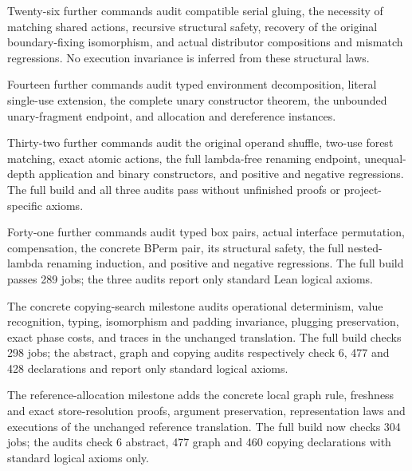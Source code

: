 Twenty-six further commands audit compatible serial gluing, the necessity of
matching shared actions, recursive structural safety, recovery of the original
boundary-fixing isomorphism, and actual distributor compositions and mismatch
regressions. No execution invariance is inferred from these structural laws.

Fourteen further commands audit typed environment decomposition, literal
single-use extension, the complete unary constructor theorem, the unbounded
unary-fragment endpoint, and allocation and dereference instances.

Thirty-two further commands audit the original operand shuffle, two-use
forest matching, exact atomic actions, the full lambda-free renaming endpoint,
unequal-depth application and binary constructors, and positive and negative
regressions. The full build and all three audits pass without unfinished proofs
or project-specific axioms.


Forty-one further commands audit typed box pairs, actual interface permutation,
compensation, the concrete BPerm pair, its structural safety, the full nested-lambda
renaming induction, and positive and negative regressions. The full build passes
289 jobs; the three audits report only standard Lean logical axioms.

The concrete copying-search milestone audits operational determinism, value
recognition, typing, isomorphism and padding invariance, plugging preservation,
exact phase costs, and traces in the unchanged translation. The full build
checks 298 jobs; the abstract, graph and copying audits respectively check
6, 477 and 428 declarations and report only standard logical axioms.

The reference-allocation milestone adds the concrete local graph rule,
freshness and exact store-resolution proofs, argument preservation,
representation laws and executions of the unchanged reference translation.
The full build now checks 304 jobs; the audits check 6 abstract, 477 graph
and 460 copying declarations with standard logical axioms only.

